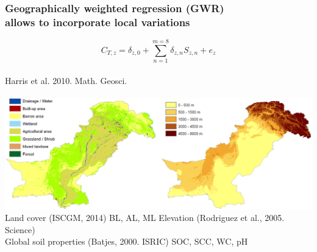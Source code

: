 \documentclass[10pt, compress]{beamer}
\begin{document}
\begin{frame}
  \frametitle{Geographically weighted regression (GWR) \protect\\ allows to incorporate local variations}
  \vspace{-15pt}
  \begin{equation*}
    C_{T,z} = \delta_{z,0} + \sum_{n=1}^{m=8}\delta_{z,n}S_{z,n} + e_z
    \end{equation*}\\
    \footnotesize Harris et al. 2010. Math. Geosci.\\ \\\normalsize
    \pause
    \includegraphics[width=1.05\textwidth]{images/Spatial_predictors.png} \\
  \alert{Land cover \footnotesize{(ISCGM, 2014)}} BL, AL, ML \hspace{4pt} \alert{Elevation \footnotesize{(Rodriguez et al., 2005. Science)}} \\
  \pause
  \alert{Global soil properties \footnotesize{(Batjes, 2000. ISRIC)}} SOC, SCC, WC, pH
\end{frame}


\end{document}
